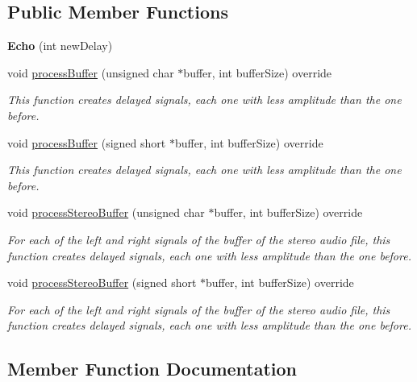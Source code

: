 \subsection*{Public Member Functions}
\begin{DoxyCompactItemize}
\item 
\mbox{\label{classEcho_a28d71de619dda9e6e51567a04bfb60d6}} 
{\bfseries Echo} (int new\+Delay)
\item 
void \hyperlink{classEcho_ae915d9d4065a34411d18791a5ae9006b}{process\+Buffer} (unsigned char $\ast$buffer, int buffer\+Size) override
\begin{DoxyCompactList}\small\item\em This function creates delayed signals, each one with less amplitude than the one before. \end{DoxyCompactList}\item 
void \hyperlink{classEcho_a3c62f947fd0f9ef063269ed2ca4fab8e}{process\+Buffer} (signed short $\ast$buffer, int buffer\+Size) override
\begin{DoxyCompactList}\small\item\em This function creates delayed signals, each one with less amplitude than the one before. \end{DoxyCompactList}\item 
void \hyperlink{classEcho_ab2dcc623d727179be1dcb8ac34a8453b}{process\+Stereo\+Buffer} (unsigned char $\ast$buffer, int buffer\+Size) override
\begin{DoxyCompactList}\small\item\em For each of the left and right signals of the buffer of the stereo audio file, this function creates delayed signals, each one with less amplitude than the one before. \end{DoxyCompactList}\item 
void \hyperlink{classEcho_a20e6822ef9fc01f0afec9cb8b890a70c}{process\+Stereo\+Buffer} (signed short $\ast$buffer, int buffer\+Size) override
\begin{DoxyCompactList}\small\item\em For each of the left and right signals of the buffer of the stereo audio file, this function creates delayed signals, each one with less amplitude than the one before. \end{DoxyCompactList}\end{DoxyCompactItemize}


\subsection{Member Function Documentation}
\mbox{\label{classEcho_ae915d9d4065a34411d18791a5ae9006b}} 
